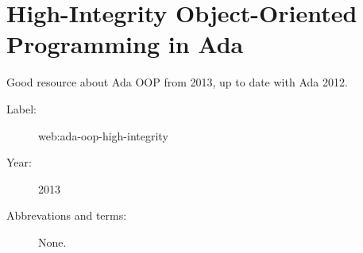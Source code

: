 \section{High-Integrity Object-Oriented Programming in Ada}

Good resource about Ada OOP from 2013, up to date with Ada 2012.

\begin{description}
    \item[Label:] web:ada-oop-high-integrity \cite{web:ada-oop-high-integrity}
    \item[Year:] 2013
    \item[Abbrevations and terms:] None.
\end{description}


